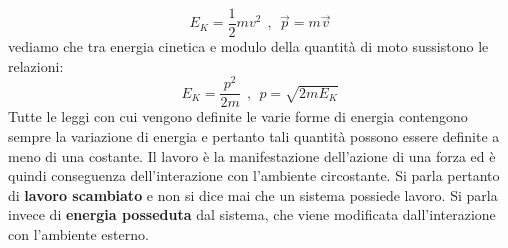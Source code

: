 \documentclass{article}
\numberwithin{equation}{subsection}
\begin{document}
\begin{equation}
    E_K=\frac{1}{2}mv^2 \ \ , \ \ \vec{p}=m\vec{v}
\end{equation}
vediamo che tra energia cinetica e modulo della quantità di moto sussistono le relazioni:
\begin{equation}
    E_K=\frac{p^2}{2m} \ \ , \ \ p=\sqrt{2mE_K}
\end{equation}
Tutte le leggi con cui vengono definite le varie forme di energia contengono sempre la variazione di energia e pertanto tali quantità possono essere definite a meno di una costante. Il lavoro è la manifestazione dell'azione di una forza ed è quindi conseguenza dell'interazione con l'ambiente circostante. Si parla pertanto di \textbf{lavoro scambiato} e non si dice mai che un sistema possiede lavoro. Si parla invece di \textbf{energia posseduta} dal sistema, che viene modificata dall'interazione con l'ambiente esterno.
\end{document}
